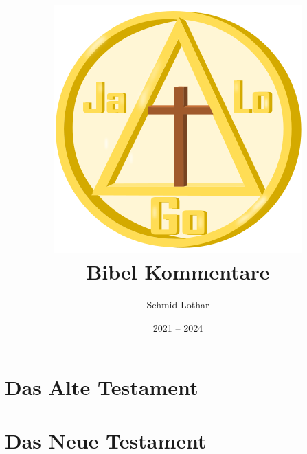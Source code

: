\documentclass{../inc/mybibbook}
\author{Schmid Lothar}
\date{2021 -- 2024}
\title{
    \includegraphics[scale=1]{../assets/images/logo.png}\\
    \textbf{Bibel Kommentare}
}
\begin{document}
\maketitle
\tableofcontents

\newpage


\chapter{Das Alte Testament}

\chapter{Das Neue Testament}
%

\end{document}
